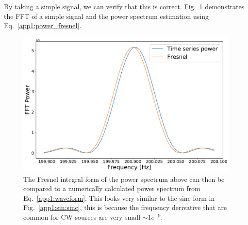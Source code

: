 By taking a simple signal, we can verify that this is correct. Fig.~\ref{app1:sinderivative:fresnel} demonstrates the \gls{FFT} of a simple signal and the power spectrum estimation using Eq.~\ref{app1:power_fresnel}.

\begin{figure}
	\centering
	\includegraphics[width=0.9\linewidth]{AppendixA/fresnel_fft.pdf}
	\caption[Comparison of power spectrum simulation with \gls{FFT} of sinusoid with frequency derivative.]{The Fresnel integral form of the power spectrum above can then be compared to a numerically calculated power spectrum from Eq.~\ref{app1:waveform}. This looks very similar to the sinc form in Fig.~\ref{app1:sin:sinc}, this is because the frequency derivative that are common for \gls{CW} sources are very small $\sim 1e^{-9} $.  }
	\label{app1:sinderivative:fresnel}
\end{figure}

